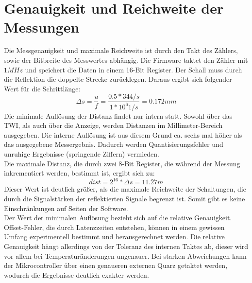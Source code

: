 \section{Genauigkeit und Reichweite der Messungen}
Die Messgenauigkeit und maximale Reichweite ist durch den Takt des Zählers, sowie der Bitbreite des Messwertes abhängig. Die Firmware taktet den Zähler mit $1MHz$ und speichert die Daten in einem 16-Bit Register. Der Schall muss durch die Reflektion die doppelte Strecke zurücklegen. Daraus ergibt sich folgender Wert für die Schrittlänge:
\begin{equation}
\Delta s = \frac{u}{f} = \frac{0.5 * 344/s}{1*10^6 1/s} = 0.172 mm
\end{equation}
Die minimale Auflösung der Distanz findet nur intern statt. Sowohl über das \ac{TWI}, als auch über die Anzeige, werden Distanzen im Millimeter-Bereich ausgegeben. Die interne Auflösung ist aus diesem Grund ca. sechs mal höher als das ausgegebene Messergebnis. Dadurch werden Quantisierungsfehler und unruhige Ergebnisse (springende Ziffern) vermieden.\\
Die maximale Distanz, die durch zwei 8-Bit Register, die während der Messung inkrementiert werden, bestimmt ist, ergibt sich zu:
\begin{equation}
dist = 2^{16} * \Delta s = 11.27 m
\end{equation}
Dieser Wert ist deutlich größer, als die maximale Reichweite der Schaltungen, die durch die Signalstärken der reflektierten Signale begrenzt ist. Somit gibt es keine Einschränkungen auf Seiten der Software.\\
Der Wert der minimalen Auflösung bezieht sich auf die relative Genauigkeit. Offset-Fehler, die durch Latenzzeiten entstehen, können in einem gewissen Umfang experimentell bestimmt und herausgerechnet werden. Die relative Genauigkeit hängt allerdings von der Toleranz des internen Taktes ab, dieser wird vor allem bei Temperaturänderungen ungenauer. Bei starken Abweichungen kann der Mikrocontroller über einen genaueren externen Quarz getaktet werden, wodurch die Ergebnisse deutlich exakter werden.


